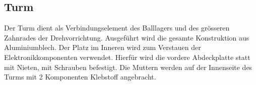 \subsection{Turm}
Der Turm dient als Verbindungselement des Balllagers und des grösseren 
Zahnrades der Drehvorrichtung. Ausgeführt wird die gesamte Konstruktion aus Aluminiumblech. Der Platz im Inneren wird zum Verstauen der 
Elektronikkomponenten verwendet. Hierfür wird die vordere Abdeckplatte statt mit Nieten, mit Schrauben befestigt. Die Muttern werden auf der Innenseite des Turms mit 2 Komponenten Klebstoff angebracht.